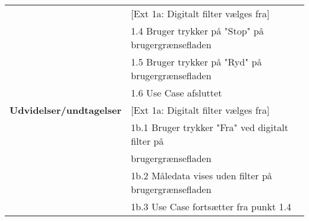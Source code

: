 \begin{table}[h!]
\begin{tabular}{l|l}
		& {[}Ext 1a: Digitalt filter vælges fra{]} \\
		& 1.4 Bruger trykker på "Stop" på brugergrænsefladen \\
		& 1.5 Bruger trykker på "Ryd" på brugergrænsefladen \\
		& 1.6 Use Case afsluttet \\ \hline
		\rowcolor[HTML]{A9D9F9} 
		\textbf{Udvidelser/undtagelser} 
		& {[}Ext 1a: Digitalt filter vælges fra{]} \\
		\rowcolor[HTML]{A9D9F9} 
		& 1b.1 Bruger trykker "Fra" ved digitalt filter på \\
		\rowcolor[HTML]{A9D9F9} 
		& brugergrænsefladen \\
		\rowcolor[HTML]{A9D9F9} 
		& 1b.2 Måledata vises uden filter på brugergrænsefladen \\
		\rowcolor[HTML]{A9D9F9} 
		& 1b.3 Use Case fortsætter fra punkt 1.4
	\end{tabular}
\end{table}